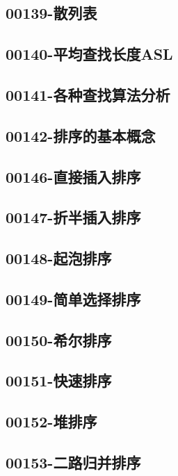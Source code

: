 \subsection{00139-散列表}

\subsection{00140-平均查找长度ASL}

\subsection{00141-各种查找算法分析}

\subsection{00142-排序的基本概念}

\subsection{00146-直接插入排序}

\subsection{00147-折半插入排序}

\subsection{00148-起泡排序}

\subsection{00149-简单选择排序}

\subsection{00150-希尔排序}

\subsection{00151-快速排序}

\subsection{00152-堆排序}

\subsection{00153-二路归并排序}

